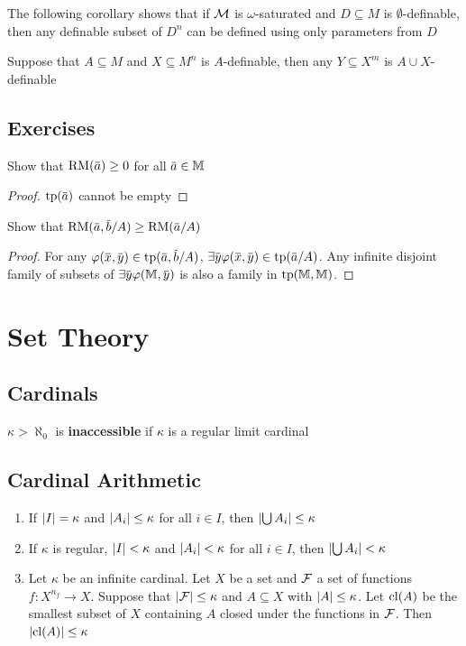 \documentclass[11pt]{article}
\begin{document}
The following corollary shows that if \(\mathcal{M}\) is \(\omega\)-saturated and \(D\subseteq M\) is \(\emptyset\)-definable, then
any definable subset of \(D^n\) can be defined using only parameters from \(D\)

\begin{corollary}[]
Suppose that \(A\subseteq M\) and \(X\subseteq M^n\) is \(A\)-definable, then any \(Y\subseteq X^m\) is \(A\cup X\)-definable
\end{corollary}
\subsection{Exercises}
\label{sec:org9c62e7e}
\begin{exercise}
\label{ex6.6.10}
Show that \(\RM(\bara)\ge 0\) for all \(\bara\in\M\)
\end{exercise}

\begin{proof}
\(\tp(\bara)\) cannot be empty
\end{proof}

\begin{exercise}
\label{ex6.6.11}
Show that \(\RM(\bara,\barb/A)\ge\RM(\bara/A)\)
\end{exercise}

\begin{proof}
For any \(\varphi(\barx,\bary)\in\tp(\bara,\barb/A)\), \(\exists\bary\varphi(\barx,\bary)\in\tp(\bara/A)\). Any
infinite disjoint family of subsets of \(\exists\bary\varphi(\M,\bary)\) is also a family in \(\operatorname{tp}(\mathbb{M},\mathbb{M})\).
\end{proof}

\appendix
\section{Set Theory}
\label{sec:org3d021e8}
\subsection{Cardinals}
\label{sec:org92b0969}
\(\kappa>\aleph_0\) is \textbf{inaccessible} if \(\kappa\) is a regular limit cardinal
\subsection{Cardinal Arithmetic}
\label{sec:org1892b16}
\begin{corollary}[]
\label{corA.15} 
\begin{enumerate}
\item If \(\abs{I}=\kappa\) and \(\abs{A_i}\le\kappa\) for all \(i\in I\), then 
\(\abs{\bigcup A_i}\le\kappa\)
\item If \(\kappa\) is regular, \(\abs{I}<\kappa\) and \(\abs{A_i}<\kappa\) for all 
\(i\in I\), then \(\abs{\bigcup A_i}<\kappa\)
\item Let \(\kappa\) be an infinite cardinal. Let \(X\) be a set and \(\mathcal{F}\) a set of
functions \(f:X^{n_f}\to X\). Suppose that \(\abs{\calf}\le\kappa\) and
\(A\subseteq X\) with \(\abs{A}\le\kappa\). Let \(\operatorname{\text{cl}}(A)\) be the smallest
subset of \(X\) containing \(A\) closed under the functions in \(\mathcal{F}\). Then 
\(\abs{\cl(A)}\le\kappa\)
\end{enumerate}
\end{corollary}
\end{document}
